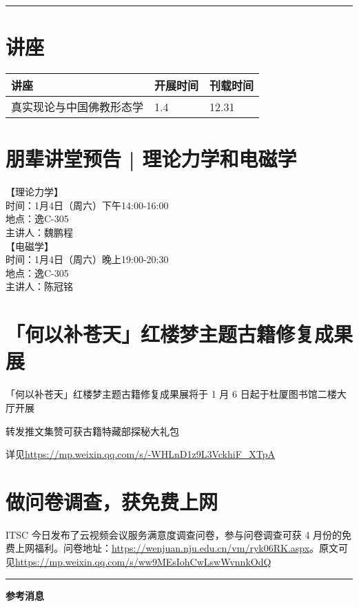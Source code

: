 \documentclass[letterpaper, 12pt]{article}
\begin{document}
\hrule
\pagebreak
\begin{multicols}{2}

\section{讲座}
\begin{tabularx}{0.5\textwidth}{|X|X|X|}
    \hline
    讲座 & 开展时间 & 刊载时间\\
    \hline\hline
真实现论与中国佛教形态学 & 1.4 & 12.31\\\hline
\end{tabularx}
\section{朋辈讲堂预告 | 理论力学和电磁学}
【理论力学】\\
时间：1月4日（周六）下午14:00-16:00\\
地点：逸C-305\\
主讲人：魏鹏程\\
【电磁学】\\
时间：1月4日（周六）晚上19:00-20:30\\
地点：逸C-305\\
主讲人：陈冠铭\\
\section{「何以补苍天」红楼梦主题古籍修复成果展}
「何以补苍天」红楼梦主题古籍修复成果展将于 1 月 6 日起于杜厦图书馆二楼大厅开展

转发推文集赞可获古籍特藏部探秘大礼包

详见\url{https://mp.weixin.qq.com/s/-WHLnD1z9L3VckhiF_XTpA}
\section{做问卷调查，获{\color{red}免费上网}}
ITSC 今日发布了云视频会议服务满意度调查问卷，参与问卷调查可获 4 月份的免费上网福利。问卷地址：\url{https://wenjuan.nju.edu.cn/vm/ryk06RK.aspx}。原文可见\url{https://mp.weixin.qq.com/s/ww9MEsIohCwLswWvnnkOdQ}
\end{multicols} 
\hrule
\vspace{4mm}
\centerline{\huge\textbf{参考消息}}
\end{document}
